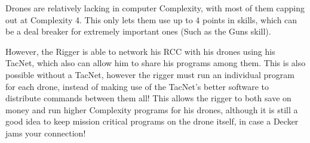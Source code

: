\begin{multicols*}{3}
	Drones are relatively lacking in computer Complexity, with most of them capping out at Complexity 4. This only lets them use up to 4 points in skills, which can be a deal breaker for extremely important ones (Such as the Guns skill).
	
	However, the Rigger is able to network his RCC with his drones using his TacNet, which also can allow him to share his programs among them. This is also possible without a TacNet, however the rigger must run an individual program for each drone, instead of making use of the TacNet's better software to distribute commands between them all! This allows the rigger to both save on money and run higher Complexity programs for his drones, although it is still a good idea to keep mission critical programs on the drone itself, in case a Decker jams your connection!
	
	
\end{multicols*}